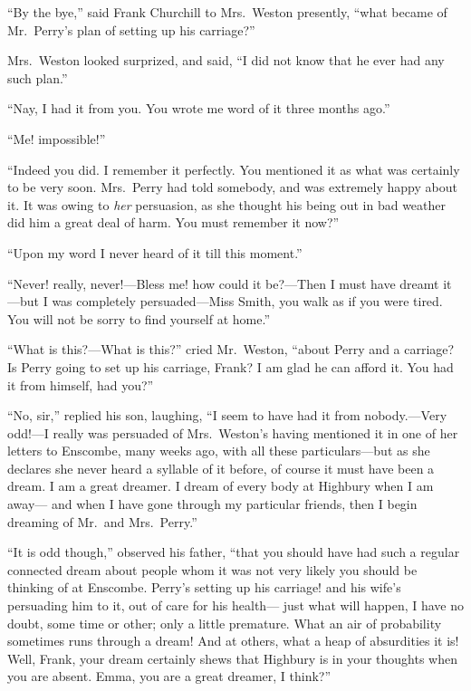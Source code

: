 ``By the bye,'' said Frank Churchill to Mrs.\ Weston presently,
``what became of Mr.\ Perry's plan of setting up his carriage?''

Mrs.\ Weston looked surprized, and said, ``I did not know that he
ever had any such plan.''

``Nay, I had it from you.  You wrote me word of it three months ago.''

``Me! impossible!''

``Indeed you did.  I remember it perfectly.  You mentioned it as
what was certainly to be very soon.  Mrs.\ Perry had told somebody,
and was extremely happy about it.  It was owing to \emph{her} persuasion,
as she thought his being out in bad weather did him a great deal
of harm.  You must remember it now?''

``Upon my word I never heard of it till this moment.''

``Never! really, never!---Bless me! how could it be?---Then I must
have dreamt it---but I was completely persuaded---Miss Smith,
you walk as if you were tired.  You will not be sorry to find
yourself at home.''

``What is this?---What is this?'' cried Mr.\ Weston, ``about Perry
and a carriage?  Is Perry going to set up his carriage, Frank?
I am glad he can afford it.  You had it from himself, had you?''

``No, sir,'' replied his son, laughing, ``I seem to have had it
from nobody.---Very odd!---I really was persuaded of Mrs.\ Weston's
having mentioned it in one of her letters to Enscombe, many weeks ago,
with all these particulars---but as she declares she never heard
a syllable of it before, of course it must have been a dream.  I am
a great dreamer.  I dream of every body at Highbury when I am away---%
and when I have gone through my particular friends, then I begin
dreaming of Mr.\ and Mrs.\ Perry.''

``It is odd though,'' observed his father, ``that you should have had such
a regular connected dream about people whom it was not very likely you
should be thinking of at Enscombe.  Perry's setting up his carriage!
and his wife's persuading him to it, out of care for his health---%
just what will happen, I have no doubt, some time or other;
only a little premature.  What an air of probability sometimes
runs through a dream!  And at others, what a heap of absurdities
it is!  Well, Frank, your dream certainly shews that Highbury is in
your thoughts when you are absent.  Emma, you are a great dreamer,
I think?''

